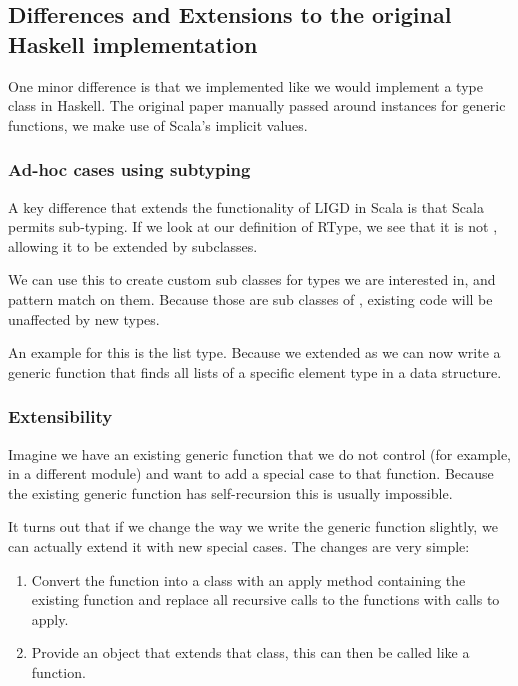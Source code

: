 \subsection{Differences and Extensions to the original Haskell implementation}
One minor difference is that we implemented  like we would implement
a type class in Haskell. The original paper manually passed around 
instances for generic functions, we make use of Scala's implicit values.


\subsubsection{Ad-hoc cases using subtyping}
A key difference that extends the functionality of LIGD in Scala is that
Scala permits sub-typing. If we look at our definition of RType, we see
that it is not , allowing it to be extended by subclasses.

We can use this to create custom sub classes for types we are interested
in, and pattern match on them. Because those are sub classes of ,
existing code will be unaffected by new types.

An example for this is the list type. Because we extended  as
 we can now write a generic function that finds all lists of a
specific element type in a data structure.

\subsubsection{Extensibility}
\label{lidg-extensible}
Imagine we have an existing generic function that we do not control (for example,
in a different module) and want to add a special case to that function. Because
the existing generic function has self-recursion this is usually impossible.

It turns out that if we change the way we write the generic function slightly,
we can actually extend it with new special cases. The changes are very simple:

\begin{enumerate}
  \item Convert the function into a class with an apply method containing the
        existing function and replace all recursive calls to the functions with
        calls to apply.
  \item Provide an object that extends that class, this can then be called like
        a function.
\end{enumerate}

